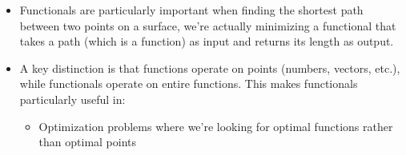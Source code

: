 \documentclass[
  ignorenonframetext,
]{beamer}
\providecommand{\tightlist}{%
  \setlength{\itemsep}{0pt}\setlength{\parskip}{0pt}}\usepackage{longtable,booktabs,array}
\begin{document}
\begin{frame}
\begin{itemize}
\item
  Functionals are particularly important when finding the shortest path
  between two points on a surface, we're actually minimizing a
  functional that takes a path (which is a function) as input and
  returns its length as output.
\item
  A key distinction is that functions operate on points (numbers,
  vectors, etc.), while functionals operate on entire functions. This
  makes functionals particularly useful in:

  \begin{itemize}
  \tightlist
  \item
    Optimization problems where we're looking for optimal functions
    rather than optimal points
  \end{itemize}
\end{itemize}
\end{frame}
\end{document}
